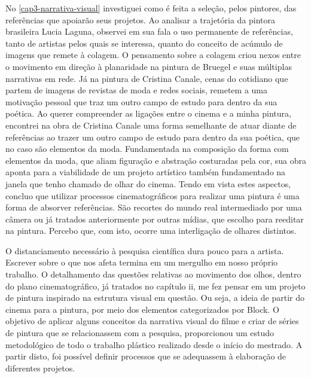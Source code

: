 No \cref{cap3-narrativa-visual} investiguei como é feita a seleção, pelos pintores, das
referências que apoiarão seus projetos. Ao analisar a trajetória da
pintora brasileira Lucia Laguna, observei em sua fala o uso permanente
de referências, tanto de artistas pelos quais se interessa, quanto do
conceito de acúmulo de imagens que remete à colagem. O pensamento sobre
a colagem criou nexos entre o movimento em direção à planaridade na
pintura de Bruegel e suas múltiplas narrativas em rede. Já na pintura
de Cristina Canale, cenas do cotidiano que partem de imagens de
revistas de moda e redes sociais, remetem a uma motivação pessoal que
traz um outro campo de estudo para dentro da sua poética. Ao querer
compreender as ligações entre o cinema e a minha pintura, encontrei na
obra de Cristina Canale uma forma semelhante de atuar diante de
referências ao trazer um outro campo de estudo para dentro da sua
poética, que no caso são elementos da moda. Fundamentada na composição
da forma com elementos da moda, que aliam figuração e abstração
costuradas pela cor, sua obra aponta para a viabilidade de um projeto
artístico também fundamentado na janela que tenho chamado de olhar do
cinema. Tendo em vista estes aspectos, concluo que utilizar processos
cinematográficos para realizar uma pintura é uma forma de absorver
referências. São recortes do mundo real intermediado por uma câmera ou
já tratados anteriormente por outras mídias, que escolho para reeditar
na pintura. Percebo que, com isto, ocorre uma interligação de olhares
distintos.

O distanciamento necessário à pesquisa científica dura pouco para a
artista. Escrever sobre o que nos afeta termina em um mergulho em nosso
próprio trabalho. O detalhamento das questões relativas ao movimento
dos olhos, dentro do plano cinematográfico, já tratados no capítulo ii,
me fez pensar em um projeto de pintura inspirado na estrutura visual em
questão. Ou seja, a ideia de partir do cinema para a pintura, por meio
dos elementos categorizados por Block. O objetivo de aplicar alguns
conceitos da narrativa visual do filme e criar de séries de pintura que
se relacionassem com a pesquisa, proporcionou um estudo metodológico de
todo o trabalho plástico realizado desde o início do mestrado. A partir
disto, foi possível definir processos que se adequassem à elaboração de
diferentes projetos.

